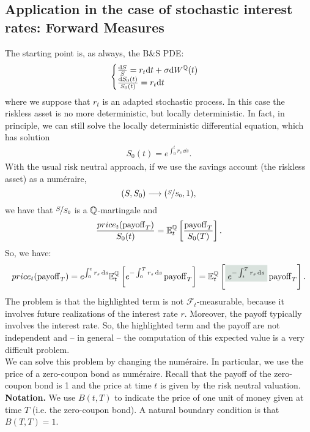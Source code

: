 \subsection[Forward Measures]{Application in the case of stochastic interest rates: Forward Measures} %
The starting point is, as always, the B\&S PDE:
\begin{equation}
    \begin{cases}
    \frac{\dd S}{S} = r_t\dd t + \sigma\dd W^{\mathbb{Q}}(t) \\
    \frac{\dd S_0(t)}{S_0(t)} = r_t\dd t
    \end{cases}
\end{equation}
where we suppose that $r_t$ is an adapted stochastic process. In this case the riskless asset is no more deterministic, but locally deterministic. In fact, in principle, we can still solve the locally deterministic differential equation, which has solution
\begin{align*}
    S_0(t) = e^{\int_0^t r_s\,\dd s}.
\end{align*}
With the usual risk neutral approach, if we use the savings account (the riskless asset) as a numéraire,
\begin{equation}
    (S,S_0)\longrightarrow(\nicefrac{S}{S_0},1),
\end{equation}
we have that $\nicefrac{S}{S_0}$ is a $\mathbb{Q}$-martingale and
\begin{equation}
    \frac{price_t(\operatorname{payoff}_T)}{S_0(t)} = \mathbb{E}_t^{\mathbb{Q}} \left[\frac{\operatorname{payoff}_T}{S_0(T)}\right].
\end{equation}
So, we have:
\begin{equation}
    price_t(\pay_T) = e^{\int_0^t r_s\,\dd s}\mathbb{E}_t^{\Qmeas} \left[e^{-\int_0^T r_s\,\dd s}\pay_T\right] = \mathbb{E}_t^{\Qmeas} \left[\hlc{mytweed}{e^{-\int_t^T r_s\,\dd s}}\pay_T\right].
\end{equation}
The problem is that the highlighted term is not $\mathcal{F}_t$-measurable, because it involves future realizations of the interest rate $r$. Moreover, the payoff typically involves the interest rate. So, the highlighted term and the payoff are not independent and -- in general -- the computation of this expected value is a very difficult problem.\\
We can solve this problem by changing the numéraire. In particular, we use the price of a zero-coupon bond as numéraire. Recall that the payoff of the zero-coupon bond is 1 and the price at time $t$ is given by the risk neutral valuation.
\medbreak
\noindent\textbf{Notation.} We use $B(t,T)$ to indicate the price of one unit of money given at time $T$ (i.e. the zero-coupon bond). A natural boundary condition is that $B(T,T)=1$.
